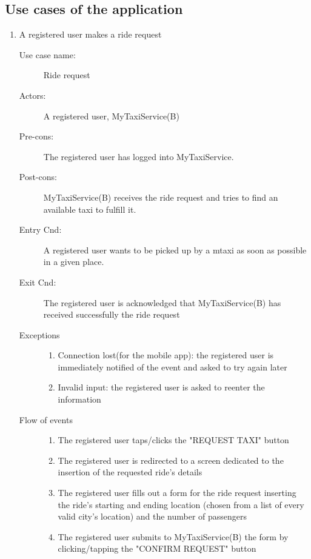 \documentclass[11pt]{article} %
\begin{document}
    \subsection{Use cases of the application}
	\begin{enumerate}	

	      \item A registered user makes a ride request
		\begin{description}
		        \item [Use case name:] Ride request 
		        \item [Actors:] A registered user, MyTaxiService(B)
		        \item [Pre-cons:] The registered user has logged into MyTaxiService.
		        \item [Post-cons:] MyTaxiService(B) receives the ride request and tries to find an available taxi to fulfill it.
		        \item [Entry Cnd:] A registered user wants to be picked up by a mtaxi as soon as possible in a given place.
		        \item [Exit Cnd:] The registered user is acknowledged that MyTaxiService(B) has received successfully the ride
		        request
		        \item [Exceptions]\hfill
			\begin{enumerate}
			          \item Connection lost(for the mobile app): the registered user is immediately notified of the event and
			          asked to try again later
			          \item Invalid input: the registered user is asked to reenter the information
			\end{enumerate}
		        \item [Flow of events]\hfill
			\begin{enumerate}
			          \item The registered user taps/clicks the "REQUEST TAXI" button
			          \item The registered user is redirected to a screen dedicated to the insertion
			          of the requested ride's details
			          \item The registered user fills out a form for the ride request inserting the ride's starting and ending location
			          (chosen from a list of every valid city's location) and the number of passengers
			          \item The registered user submits to MyTaxiService(B) the form by clicking/tapping the "CONFIRM REQUEST" button

\end{enumerate}
\end{description}
\end{enumerate}
\end{document}

